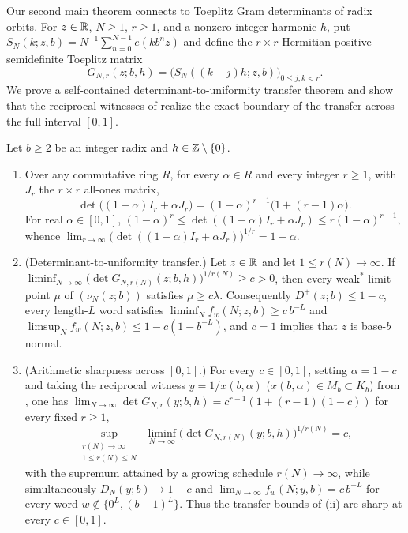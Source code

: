\documentclass[11pt]{article}
\begin{document}
Our second main theorem connects  to Toeplitz Gram determinants of radix orbits. For $z\in\mathbb R$, $N\ge1$, $r\ge1$, and a nonzero integer harmonic $h$, put $S_N(k;z,b)=N^{-1}\sum_{n=0}^{N-1}e(kb^nz)$ and define the $r\times r$ Hermitian positive semidefinite Toeplitz matrix
\[
G_{N,r}(z;b,h)=\bigl(S_N((k-j)h;z,b)\bigr)_{0\le j,k<r}.
\]
We prove a self-contained determinant-to-uniformity transfer theorem and show that the reciprocal witnesses of  realize the exact boundary of the transfer across the full interval $[0,1]$.

\begin{maintheorem}\label{thm:B}
Let $b\ge2$ be an integer radix and $h\in\mathbb Z\setminus\{0\}$.
\begin{enumerate}[label=\textup{(\roman*)},nosep]
\item Over any commutative ring $R$, for every $\alpha\in R$ and every integer $r\ge1$, with $J_r$ the $r\times r$ all-ones matrix,
\[
\det\bigl((1-\alpha)I_r+\alpha J_r\bigr)=(1-\alpha)^{r-1}\bigl(1+(r-1)\alpha\bigr).
\]
For real $\alpha\in[0,1]$, $(1-\alpha)^r\le\det((1-\alpha)I_r+\alpha J_r)\le r(1-\alpha)^{r-1}$, whence $\lim_{r\to\infty}\bigl(\det((1-\alpha)I_r+\alpha J_r)\bigr)^{1/r}=1-\alpha$.
\item \textup{(Determinant-to-uniformity transfer.)} Let $z\in\mathbb R$ and let $1\le r(N)\to\infty$. If $\liminf_{N\to\infty}\bigl(\det G_{N,r(N)}(z;b,h)\bigr)^{1/r(N)}\ge c>0$, then every weak$^*$ limit point $\mu$ of $(\nu_N(z;b))$ satisfies $\mu\ge c\lambda$. Consequently $D^+(z;b)\le 1-c$, every length-$L$ word satisfies $\liminf_N f_w(N;z,b)\ge c\,b^{-L}$ and $\limsup_N f_w(N;z,b)\le 1-c(1-b^{-L})$, and $c=1$ implies that $z$ is base-$b$ normal.
\item \textup{(Arithmetic sharpness across $[0,1]$.)} For every $c\in[0,1]$, setting $\alpha=1-c$ and taking the reciprocal witness $y=1/x(b,\alpha)$ ($x(b,\alpha)\in M_b\subset K_b$) from , one has $\lim_{N\to\infty}\det G_{N,r}(y;b,h)=c^{r-1}(1+(r-1)(1-c))$ for every fixed $r\ge1$,
\[
\sup_{\substack{r(N)\to\infty\\ 1\le r(N)\le N}}\ \liminf_{N\to\infty}\bigl(\det G_{N,r(N)}(y;b,h)\bigr)^{1/r(N)}=c,
\]
with the supremum attained by a growing schedule $r(N)\to\infty$, while simultaneously $D_N(y;b)\to 1-c$ and $\lim_{N\to\infty}f_w(N;y,b)=c\,b^{-L}$ for every word $w\notin\{0^L,(b-1)^L\}$. Thus the transfer bounds of \textup{(ii)} are sharp at every $c\in[0,1]$.
\end{enumerate}
\end{maintheorem}
\end{document}
